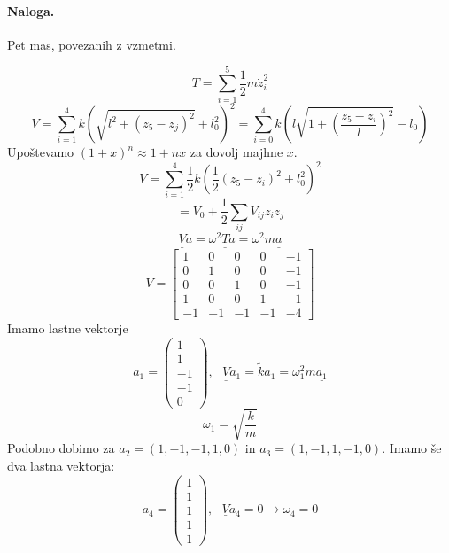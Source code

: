 \documentclass[a4paper]{article}
\newcommand{\duline}[1]{\underline{\underline{#1}}}
\begin{document}
\paragraph{Naloga.} Pet mas, povezanih z vzmetmi.
\begin{figure}[h!]
    \centering
\end{figure}
$$T = \sum_{i=1}^{5} \frac{1}{2}m\dot z_i^2$$
$$V = \sum_{i=1}^{4} k\left(\sqrt{l^2 + (z_5 - z_j)^2} + l_0^2\right)^2 = \sum_{i=0}^{4} k\left(l \sqrt{1 + \left(\frac{z_5 - z_i}{l}\right)^2} - l_0\right)$$
Upoštevamo $(1 + x)^n \approx 1 + nx$ za dovolj majhne $x$.
$$V = \sum_{i=1}^{4} \frac{1}{2}k\left(\frac{1}{2}(z_5 - z_i)^2 + l_0^2\right)^2$$
$$= V_0 + \frac{1}{2}\sum_{ij} V_{ij} z_i z_j$$
$$\duline{V}\underline{a} = \omega^2 \duline{T}\underline{a} = \omega^2 m\duline{a}$$
$$V = \begin{bmatrix}
    1 & 0 & 0 & 0 & -1 \\
    0 & 1 & 0 & 0 & -1 \\
    0 & 0 & 1 & 0 & -1 \\
    1 & 0 & 0 & 1 & -1 \\
    -1 & -1 & -1 & -1 & -4
\end{bmatrix}$$
Imamo lastne vektorje
$$a_1 = \begin{pmatrix} 1 \\ 1 \\ -1 \\ -1 \\ 0 \end{pmatrix},~~~\duline{V} a_1 = \tilde{k}a_1 = \omega_1^2m\underline{a_1}$$
$$\omega_1 = \sqrt{\frac{k}{m}}$$
Podobno dobimo za $a_2 = (1, -1, -1, 1, 0)$ in $a_3 = (1, -1, 1, -1, 0)$. Imamo še dva lastna vektorja:
$$a_4 = \begin{pmatrix}
    1 \\ 1 \\ 1 \\ 1 \\ 1
\end{pmatrix},~~~\duline{V}a_4 = 0 \rightarrow \omega_4 = 0$$
\end{document}
